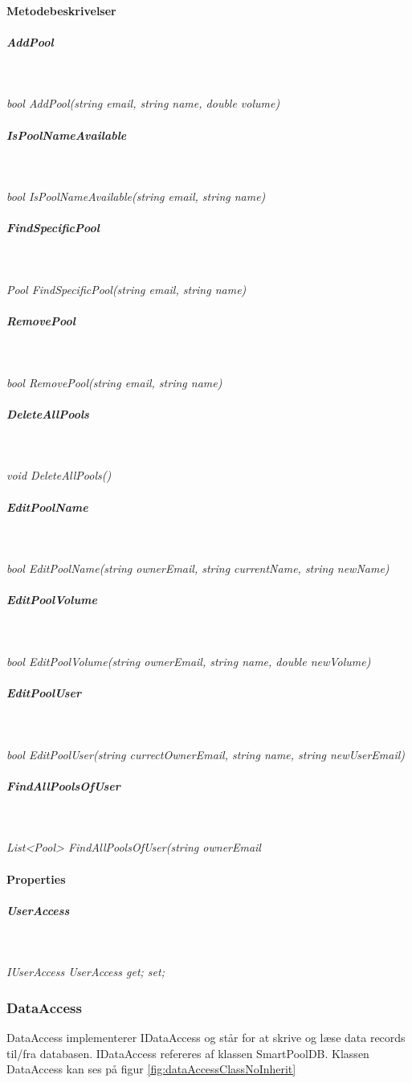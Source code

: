 \paragraph{Metodebeskrivelser}

\subparagraph{AddPool}\

\textit{bool AddPool(string email, string name, double volume)}

\subparagraph{IsPoolNameAvailable}\

\textit{bool IsPoolNameAvailable(string email, string name)}

\subparagraph{FindSpecificPool}\

\textit{Pool FindSpecificPool(string email, string name)}

\subparagraph{RemovePool}\

\textit{bool RemovePool(string email, string name)}

\subparagraph{DeleteAllPools}\

\textit{void DeleteAllPools()}

\subparagraph{EditPoolName}\

\textit{bool EditPoolName(string ownerEmail, string currentName, string newName)}

\subparagraph{EditPoolVolume}\

\textit{bool EditPoolVolume(string ownerEmail, string name, double newVolume)}

\subparagraph{EditPoolUser}\

\textit{bool EditPoolUser(string currectOwnerEmail, string name, string newUserEmail)}


\subparagraph{FindAllPoolsOfUser}\

\textit{List<Pool> FindAllPoolsOfUser(string ownerEmail}

\paragraph{Properties}

\subparagraph{UserAccess}\

\textit{IUserAccess UserAccess { get; set; }}


\subsubsection{DataAccess}
DataAccess implementerer IDataAccess og står for at skrive og læse data records til/fra databasen.
IDataAccess refereres af klassen SmartPoolDB. Klassen DataAccess kan ses på figur \ref{fig:dataAccessClassNoInherit}

